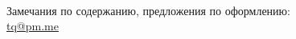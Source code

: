 \tableofcontents
{}
\vfill ~
\begin{center}
Замечания по содержанию, предложения по оформлению: \\

\href{mailto:tq@pm.me}{tq@pm.me}
\end{center}
